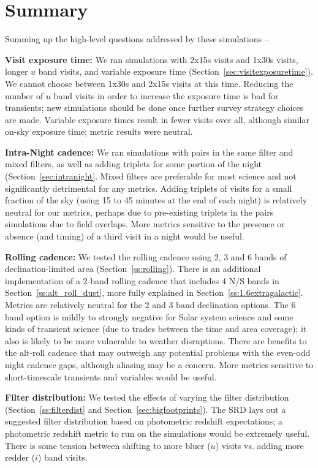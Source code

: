 \section{Summary}

Summing up the high-level questions addressed by these simulations --

{\bf Visit exposure time:}  We ran simulations with 2x15s visits and 1x30s visits, longer $u$ band visits, and variable exposure time (Section~\ref{sec:visitexposuretime}). We cannot choose between 1x30s and 2x15s visits at this time. Reducing the number of $u$ band visits in order to increase the exposure time is bad for transients; new simulations should be done once further survey strategy choices are made. Variable exposure times result in fewer visits over all, although similar on-sky exposure time; metric results were neutral. 

{\bf Intra-Night cadence:} We ran simulations with pairs in the same filter and mixed filters, as well as adding triplets for some portion of the night (Section~\ref{sec:intranight}. Mixed filters are preferable for most science and not significantly detrimental for any metrics. Adding triplets of visits for a small fraction of the sky (using 15 to 45 minutes at the end of each night) is relatively neutral for our metrics, perhaps due to pre-existing triplets in the pairs simulations due to field overlaps. More metrics sensitive to the presence or absence (and timing) of a third visit in a night would be useful.

{\bf Rolling cadence:} We tested the rolling cadence using 2, 3 and 6 bands of declination-limited area (Section~\ref{ss:rolling}). There is an additional implementation of a 2-band rolling cadence that includes 4 N/S bands in Section~\ref{ss:alt_roll_dust}, more fully explained in Section~\ref{ss:1.6extragalactic}. Metrics are relatively neutral for the 2 and 3 band declination options. The 6 band option is mildly to strongly negative for Solar system science and some kinds of transient science (due to trades between the time and area coverage); it also is likely to be more vulnerable to weather disruptions. There are benefits to the alt-roll cadence that may outweigh any potential problems with the even-odd night cadence gaps, although aliasing may be a concern. More metrics sensitive to short-timescale transients and variables would be useful. 

{\bf Filter distribution:} We tested the effects of varying the filter distribution (Section~\ref{ss:filterdist} and Section~\ref{sec:bigfootprints}). The SRD lays out a suggested filter distribution based on photometric redshift expectations; a photometric redshift metric to run on the simulations would be extremely useful. There is some tension between shifting to more bluer ($u$) visits vs. adding more redder ($i$) band visits. 

